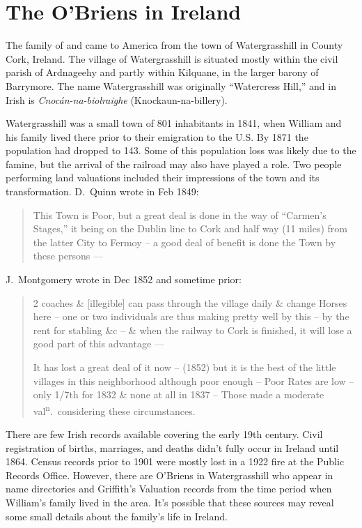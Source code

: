 \chapter{The O'Briens in Ireland}

The family of  and  came to America from the town of Watergrasshill in County Cork, Ireland.\cite{Edward2OBrienNaturalization,Michael2OBrienNaturalization,Margaret3DooleyBaptism} The village of Watergrasshill is situated mostly within the civil parish of Ardnageehy and partly within Kilquane, in the larger barony of Barrymore.\cite{TopographicalDictionary} The name Watergrasshill was originally ``Watercress Hill,'' and in Irish is \textit{Cnoc\'{a}n-na-biolraighe} (Knockaun-na-billery).\cite{LocalNames} 

Watergrasshill was a small town of 801 inhabitants in 1841, when William and his family lived there prior to their emigration to the U.S. By 1871 the population had dropped to 143\cite{Population}. Some of this population loss was likely due to the famine, but the arrival of the railroad may also have played a role. Two people performing land valuations included their impressions of the town and its transformation. D.\ Quinn wrote in Feb 1849:

\begin{quote}
	This Town is Poor, but a great deal is done in the way of ``Carmen's Stages,'' it being on the Dublin line to Cork and half way (11 miles) from the latter City to Fermoy -- a good deal of benefit is done the Town by these persons ---\cite{HouseIntro}
\end{quote}

J.\ Montgomery wrote in Dec 1852 and sometime prior:

\begin{quote}
	2 coaches \& [illegible] can pass through the village daily \& change Horses here -- one or two individuals are thus making pretty well by this -- by the rent for stabling \&c -- \& when the railway to Cork is finished, it will lose a good part of this advantage ---
	
	It has lost a great deal of it now -- (1852) but it is the best of the little villages in this neighborhood although poor enough -- Poor Rates are low -- only 1/7th for 1832 \& none at all in 1837 -- Those made a moderate val\textsuperscript{n}.\ considering these circumstances.\cite{HouseIntro}
\end{quote}

There are few Irish records available covering the early 19th century. Civil registration of births, marriages, and deaths didn't fully occur in Ireland until 1864.\cite{Grenham1} Census records prior to 1901 were mostly lost in a 1922 fire at the Public Records Office.\cite{Grenham18} However, there are O'Briens in Watergrasshill who appear in name directories and Griffith's Valuation records from the time period when William's family lived in the area. It's possible that these sources may reveal some small details about the family's life in Ireland.

